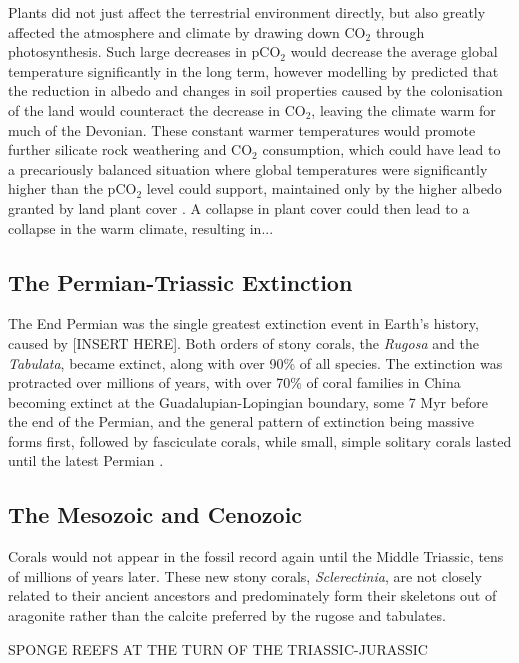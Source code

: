 \documentclass[11pt,a4paper]{article}
\begin{document}
Plants did not just affect the terrestrial environment directly, but also greatly affected the atmosphere and climate by drawing down CO$_{2}$ through photosynthesis.
 Such large decreases in pCO$_{2}$ would decrease the average global temperature significantly in the long term, however modelling by \cite{LeHir2011} predicted that the reduction in albedo and changes in soil properties caused by the colonisation of the land would counteract the decrease in CO$_{2}$, leaving the climate warm for much of the Devonian.
 These constant warmer temperatures would promote further silicate rock weathering and CO$_{2}$ consumption, which could have lead to a precariously balanced situation where global temperatures were significantly higher than the pCO$_{2}$ level could support, maintained only by the higher albedo granted by land plant cover \citep{LeHir2011}.
 A collapse in plant cover could then lead to a collapse in the warm climate, resulting in...

\subsection{The Permian-Triassic Extinction}

The End Permian was the single greatest extinction event in Earth's history, caused by [INSERT HERE].
 Both orders of stony corals, the \textit{Rugosa} and the \textit{Tabulata}, became extinct, along with over 90\% of all species.
 The extinction was protracted over millions of years, with over 70\% of coral families in China becoming extinct at the Guadalupian-Lopingian boundary, some 7 Myr before the end of the Permian, and the general pattern of extinction being massive forms first, followed by fasciculate corals, while small, simple solitary corals lasted until the latest Permian \citep{Wang2007}. 

\subsection{The Mesozoic and Cenozoic}

Corals would not appear in the fossil record again until the Middle Triassic, tens of millions of years later.
 These new stony corals, \textit{Sclerectinia}, are not closely related to their ancient ancestors and predominately form their skeletons out of aragonite rather than the calcite preferred by the rugose and tabulates. 

SPONGE REEFS AT THE TURN OF THE TRIASSIC-JURASSIC
\end{document}
